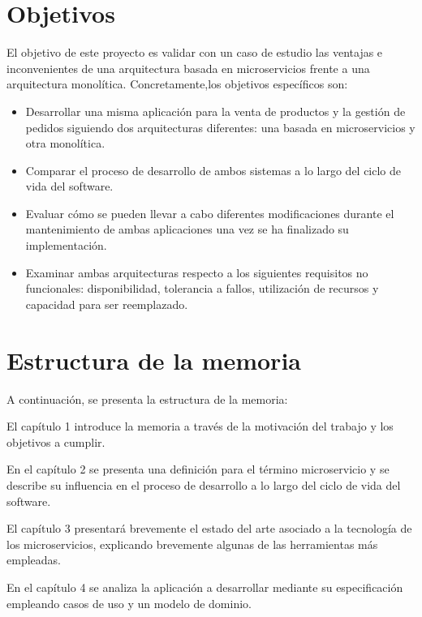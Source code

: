 \documentclass[11pt,spanish,listoffigures]{tfgetsinf}
\begin{document}
\section{Objetivos}

El objetivo de este proyecto es validar con un caso de estudio las ventajas e inconvenientes de una arquitectura basada en microservicios frente a una arquitectura monolítica. Concretamente,los objetivos específicos son:

\begin{itemize}

\item Desarrollar una misma aplicación para la venta de productos y la gestión de pedidos siguiendo dos arquitecturas diferentes: una basada en microservicios y otra monolítica.

\item Comparar el proceso de desarrollo de ambos sistemas a lo largo del ciclo de vida del software.

\item Evaluar cómo se pueden llevar a cabo diferentes modificaciones durante el mantenimiento de ambas aplicaciones una vez se ha finalizado su implementación.

\item Examinar ambas arquitecturas respecto a los siguientes requisitos no funcionales: disponibilidad, tolerancia a fallos, utilización de recursos y capacidad para ser reemplazado.

\end{itemize}

\section{Estructura de la memoria}

A continuación, se presenta la estructura de la memoria:

El capítulo 1 introduce la memoria a través de la motivación del trabajo y los objetivos a cumplir.

En el capítulo 2 se presenta una definición para el término microservicio y se describe su influencia en el proceso de desarrollo a lo largo del ciclo de vida del software.

El capítulo 3 presentará brevemente el estado del arte asociado a la tecnología de los microservicios, explicando brevemente algunas de las herramientas más empleadas.

En el capítulo 4 se analiza la aplicación a desarrollar mediante su especificación   empleando casos de uso y un modelo de dominio.
\end{document}
